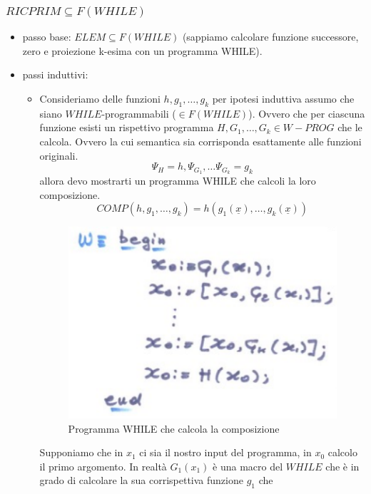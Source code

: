 \documentclass{article}
\begin{document}
\subsubsection{$RICPRIM\subseteq F(WHILE)$}
\begin{itemize}
    \item passo base: $ELEM\subseteq F(WHILE)$ (sappiamo calcolare funzione successore, zero
          e proiezione k-esima con un programma WHILE).
    \item passi induttivi:
          \begin{itemize}
              \item
                    Consideriamo delle funzioni $h,g_1,\dots,g_k$ per ipotesi induttiva assumo
                    che siano $WHILE$-programmabili ($\in F(WHILE)$). Ovvero che per ciascuna funzione
                    esisti un rispettivo programma $H,G_1,\dots,G_k\in W-PROG$ che le calcola. Ovvero
                    la cui semantica sia corrisponda esattamente alle funzioni originali.
                    $$\Psi_H=h, \Psi_{G_1},\dots\Psi_{G_k}=g_k$$
                    allora devo mostrarti un programma WHILE che calcoli la loro composizione.
                    $$COMP(h,g_1,\dots,g_k)=h(g_1(\underline{x}),\dots,g_k(\underline{x}))$$
                    \begin{figure}[H]
                        \centering
                        \includegraphics[scale=0.5]{images/while-comp.png}
                        \caption{Programma WHILE che calcola la composizione}
                    \end{figure}
                    Supponiamo che in $x_1$ ci sia il nostro input del programma, in $x_0$
                    calcolo il primo argomento. In realtà $G_1(x_1)$ è una macro del $WHILE$
                    che è in grado di calcolare la sua corrispettiva funzione $g_1$ che

\end{itemize}
\end{itemize}
\end{document}
